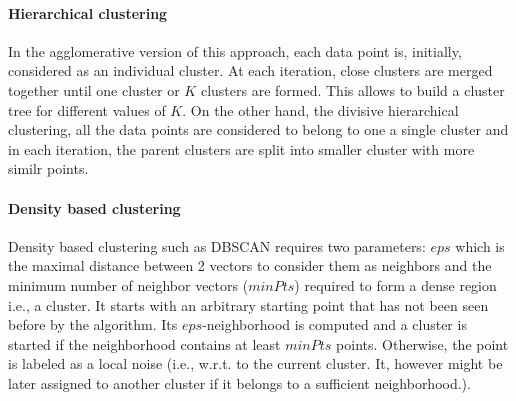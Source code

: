 \documentclass{article}
\begin{document}
\paragraph{Hierarchical clustering} \cite{murtagh2014ward} In the agglomerative version of this approach, each data point is, initially, considered as an individual cluster. At each iteration, close clusters are merged together until one cluster or $K$ clusters are formed. This allows to build a cluster tree for different values of $K$. On the other hand, the divisive hierarchical clustering, all the data points  are considered to belong to one a single cluster and in each iteration, the parent clusters are split into smaller cluster with more similr points.

\paragraph{Density based clustering} Density based clustering such as DBSCAN \cite{ester1996density} requires two parameters: $eps$ which is the maximal distance between 2 vectors to consider them as neighbors and the minimum number of neighbor vectors ($minPts$) required to form a dense region i.e., a cluster. It starts with an arbitrary starting point that has not been seen before by the algorithm. Its $eps$-neighborhood is computed and  a cluster is started if the neighborhood contains at least $minPts$ points. Otherwise, the point is labeled as a local noise (i.e., w.r.t. to the current cluster. It, however might be later assigned to another cluster if it belongs to a sufficient neighborhood.). 
\end{document}
